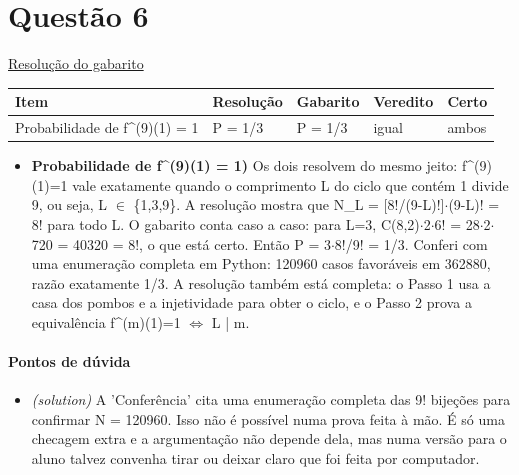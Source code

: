 \documentclass{article}%
\begin{document}
\section*{Questão 6}%
\href{https://poliedroresolve.sistemapoliedro.com.br/vestibulares/ime/2027/ime-2-fase-dia-1-26-10-2026-2-fase-dia-1/dissertativa-6-matematica-2-fase-dia-1-ime-2027}{Resolução do gabarito}\par\smallskip%
\begin{longtable}{@{}p{} p{} p{} p{} p{}@{}}\toprule Item & Resolução & Gabarito & Veredito & Certo \\ \midrule
Probabilidade de f\^{}(9)(1) = 1 & P = 1/3 & P = 1/3 & igual & ambos \\
\bottomrule\end{longtable}%
\begin{itemize}%
\item%
\textbf{Probabilidade de f\^{}(9)(1) = 1)} Os dois resolvem do mesmo jeito: f\^{}(9)(1)=1 vale exatamente quando o comprimento L do ciclo que contém 1 divide 9, ou seja, L $\in$ \{1,3,9\}. A resolução mostra que N\_L = {[}8!/(9-L)!{]}$\cdot$(9-L)! = 8! para todo L. O gabarito conta caso a caso: para L=3, C(8,2)$\cdot$2$\cdot$6! = 28$\cdot$2$\cdot$720 = 40320 = 8!, o que está certo. Então P = 3$\cdot$8!/9! = 1/3. Conferi com uma enumeração completa em Python: 120960 casos favoráveis em 362880, razão exatamente 1/3. A resolução também está completa: o Passo 1 usa a casa dos pombos e a injetividade para obter o ciclo, e o Passo 2 prova a equivalência f\^{}(m)(1)=1 $\Leftrightarrow$ L | m.%
\end{itemize}%
\paragraph{Pontos de dúvida}%
\begin{itemize}%
\item%
\textit{(solution)} A 'Conferência' cita uma enumeração completa das 9! bijeções para confirmar N = 120960. Isso não é possível numa prova feita à mão. É só uma checagem extra e a argumentação não depende dela, mas numa versão para o aluno talvez convenha tirar ou deixar claro que foi feita por computador.%
\end{itemize}%
\end{document}
